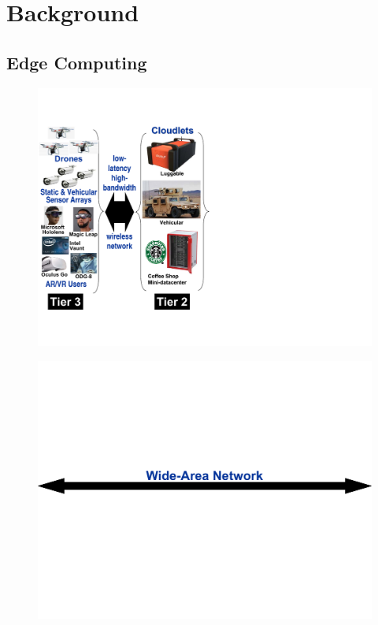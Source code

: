 \chapter{Background}
\label{chapter: background}

\section{Edge Computing}
\label{sec: bg-edge}

\begin{figure}[t]
    \begin{minipage}[c]{2.5in}
        \includegraphics[scale=0.45]{FIGS/fig-3tier-A.pdf}
    \end{minipage}
    \begin{minipage}[c]{2.7in}
        \includegraphics[scale=0.25]{FIGS/fig-3tier-B-cropped.pdf}\\

\end{minipage}
\end{figure}
